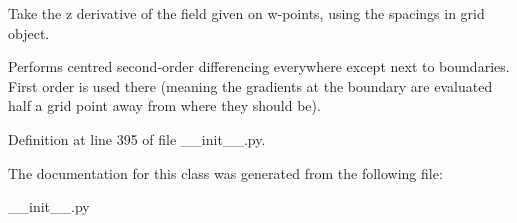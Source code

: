 Take the z derivative of the field given on w-\/points, using the spacings in grid object. 

Performs centred second-\/order differencing everywhere except next to boundaries. First order is used there (meaning the gradients at the boundary are evaluated half a grid point away from where they should be). 

Definition at line 395 of file \+\_\+\+\_\+init\+\_\+\+\_\+.\+py.



The documentation for this class was generated from the following file\+:\begin{DoxyCompactItemize}
\item 
\+\_\+\+\_\+init\+\_\+\+\_\+.\+py\end{DoxyCompactItemize}
